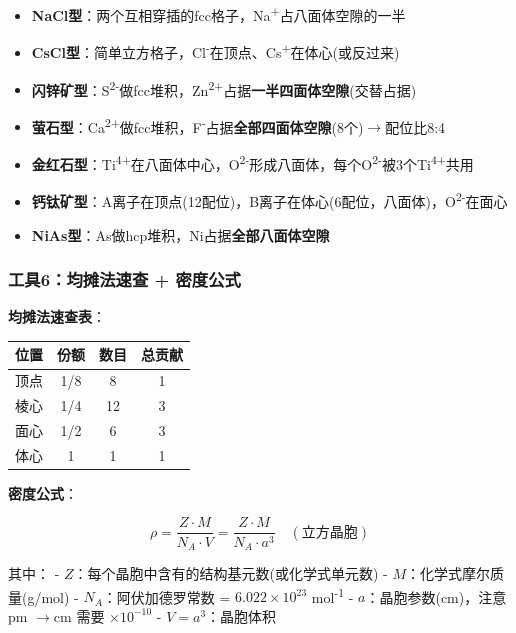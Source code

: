 \documentclass[a4paper,11pt]{ctexart}
\providecommand{\tightlist}{\setlength{\itemsep}{0pt}\setlength{\parskip}{0pt}}
\newcounter{none}
\newcommand{\箭}{\ensuremath{\rightarrow}}
\newcommand{\左箭}{\ensuremath{\leftarrow}}
\newcommand{\上箭}{\ensuremath{\uparrow}}
\newcommand{\下箭}{\ensuremath{\downarrow}}
\newcommand{\衡}{\ensuremath{\rightleftharpoons}}
\newcommand{\双箭}{\ensuremath{\leftrightarrow}}
\newcommand{\约等于}{\ensuremath{\approx}}
\newcommand{\小于等于}{\ensuremath{\leq}}
\newcommand{\大于等于}{\ensuremath{\geq}}
\newcommand{\不等于}{\ensuremath{\neq}}
\newcommand{\西格马}{\ensuremath{\sigma}}
\newcommand{\派}{\ensuremath{\pi}}
\begin{document}
\begin{itemize}
\tightlist
\item
  \textbf{NaCl型}：两个互相穿插的fcc格子，Na\textsuperscript{+}占八面体空隙的一半
\item
  \textbf{CsCl型}：简单立方格子，Cl\textsuperscript{-}在顶点、Cs\textsuperscript{+}在体心(或反过来)
\item
  \textbf{闪锌矿型}：S\textsuperscript{2-}做fcc堆积，Zn\textsuperscript{2+}占据\textbf{一半四面体空隙}(交替占据)
\item
  \textbf{萤石型}：Ca\textsuperscript{2+}做fcc堆积，F\textsuperscript{-}占据\textbf{全部四面体空隙}(8个)\箭 配位比8:4
\item
  \textbf{金红石型}：Ti\textsuperscript{4+}在八面体中心，O\textsuperscript{2-}形成八面体，每个O\textsuperscript{2-}被3个Ti\textsuperscript{4+}共用
\item
  \textbf{钙钛矿型}：A离子在顶点(12配位)，B离子在体心(6配位，八面体)，O\textsuperscript{2-}在面心
\item
  \textbf{NiAs型}：As做hcp堆积，Ni占据\textbf{全部八面体空隙}
\end{itemize}

\subsubsection{工具6：均摊法速查 + 密度公式}\label{ux5de5ux51776ux5747ux644aux6cd5ux901fux67e5-ux5bc6ux5ea6ux516cux5f0f}

\textbf{均摊法速查表}：

{\def\LTcaptype{none} %
\begin{longtable}[]{@{}lccc@{}}
\toprule\noalign{}
位置 & 份额 & 数目 & 总贡献 \\
\midrule\noalign{}
\endhead
\bottomrule\noalign{}
\endlastfoot
顶点 & 1/8 & 8 & 1 \\
棱心 & 1/4 & 12 & 3 \\
面心 & 1/2 & 6 & 3 \\
体心 & 1 & 1 & 1 \\
\end{longtable}
}

\textbf{密度公式}：

\[\rho = \frac{Z \cdot M}{N_A \cdot V} = \frac{Z \cdot M}{N_A \cdot a^3} \quad (\text{立方晶胞})\]

其中：
- \(Z\)：每个晶胞中含有的结构基元数(或化学式单元数)
- \(M\)：化学式摩尔质量(g/mol)
- \(N_A\)：阿伏加德罗常数 = \(6.022 \times 10^{23}\) mol\textsuperscript{-1}
- \(a\)：晶胞参数(cm)，注意pm \箭 cm 需要 \(\times 10^{-10}\)
- \(V = a^3\)：晶胞体积
\end{document}
